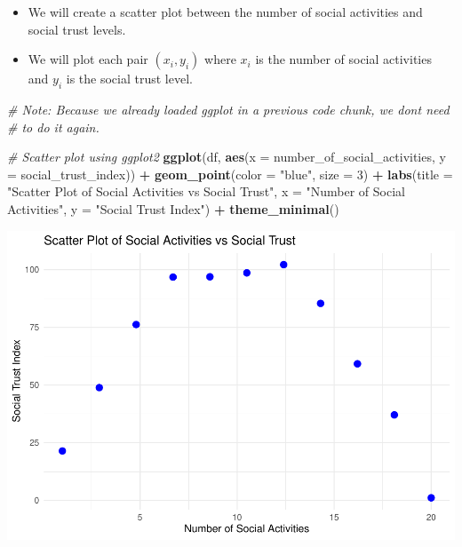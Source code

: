 \documentclass[
  11pt,
]{article}
\newenvironment{Shaded}{\begin{snugshade}}{\end{snugshade}}
\newcommand{\AttributeTok}[1]{\textcolor[rgb]{0.13,0.29,0.53}{#1}}
\newcommand{\CommentTok}[1]{\textcolor[rgb]{0.56,0.35,0.01}{\textit{#1}}}
\newcommand{\DecValTok}[1]{\textcolor[rgb]{0.00,0.00,0.81}{#1}}
\newcommand{\FunctionTok}[1]{\textcolor[rgb]{0.13,0.29,0.53}{\textbf{#1}}}
\newcommand{\NormalTok}[1]{#1}
\newcommand{\SpecialCharTok}[1]{\textcolor[rgb]{0.81,0.36,0.00}{\textbf{#1}}}
\newcommand{\StringTok}[1]{\textcolor[rgb]{0.31,0.60,0.02}{#1}}
\providecommand{\tightlist}{%
  \setlength{\itemsep}{0pt}\setlength{\parskip}{0pt}}
\begin{document}
\begin{itemize}
\tightlist
\item
  We will create a scatter plot between the number of social activities
  and social trust levels.
\item
  We will plot each pair \((x_i, y_i)\) where \(x_i\) is the number of
  social activities and \(y_i\) is the social trust level.
\end{itemize}

\begin{Shaded}
\begin{Highlighting}[]
\CommentTok{\# Note: Because we already loaded ggplot in a previous code chunk, we dont need}
\CommentTok{\# to do it again.}

\CommentTok{\# Scatter plot using ggplot2}
\FunctionTok{ggplot}\NormalTok{(df, }\FunctionTok{aes}\NormalTok{(}\AttributeTok{x =}\NormalTok{ number\_of\_social\_activities, }\AttributeTok{y =}\NormalTok{ social\_trust\_index)) }\SpecialCharTok{+} \FunctionTok{geom\_point}\NormalTok{(}\AttributeTok{color =} \StringTok{"blue"}\NormalTok{,}
    \AttributeTok{size =} \DecValTok{3}\NormalTok{) }\SpecialCharTok{+} \FunctionTok{labs}\NormalTok{(}\AttributeTok{title =} \StringTok{"Scatter Plot of Social Activities vs Social Trust"}\NormalTok{,}
    \AttributeTok{x =} \StringTok{"Number of Social Activities"}\NormalTok{, }\AttributeTok{y =} \StringTok{"Social Trust Index"}\NormalTok{) }\SpecialCharTok{+} \FunctionTok{theme\_minimal}\NormalTok{()}
\end{Highlighting}
\end{Shaded}

\includegraphics{Problem-Sets/Answers-Files/Answers-PS1/unnamed-chunk-7-1.pdf}
\end{document}
